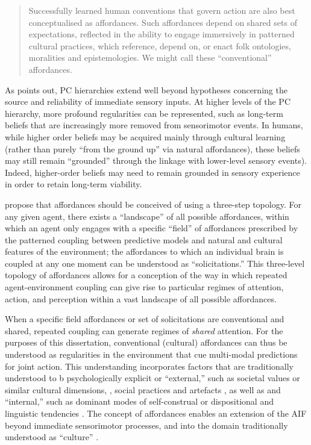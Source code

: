 \begin{CJK}{UTF8}{gbsn}
\begin{quote}
  Successfully learned human conventions that govern action are also best conceptualised as affordances. Such affordances depend on shared sets of expectations, reflected in the ability to engage immersively in patterned cultural practices, which reference, depend on, or enact folk ontologies, moralities and epistemologies. We might call these ``conventional'' affordances.
\end{quote}

As \textcite[906]{Pezzulo2014} points out, PC hierarchies extend well beyond hypotheses concerning the source and reliability of immediate sensory inputs. At higher levels of the PC hierarchy, more profound regularities can be represented, such as long-term beliefs that are increasingly more removed from sensorimotor events. In humans, while higher order beliefs may be acquired mainly through cultural learning (rather than purely ``from the ground up'' via natural affordances),  these beliefs may still remain ``grounded'' through the linkage with lower-level sensory events).  Indeed, higher-order beliefs may need to remain grounded in sensory experience in order to retain long-term viability.

\textcite{Bruineberg2014} propose that affordances should be conceived of using a three-step topology. For any given agent, there exists a ``landscape'' of all possible affordances, within which an agent only engages with a specific ``field'' of affordances prescribed by the patterned coupling between predictive models and natural and cultural features of the environment; the affordances to which an individual brain is coupled at any one moment can be understood as ``solicitations.''  This three-level topology of affordances allows for a conception of the way in which repeated agent-environment coupling can give rise to particular regimes of attention, action, and perception within a vast landscape of all possible affordances.

When a specific field affordances or set of solicitations are conventional and shared, repeated coupling can generate regimes of \textit{shared} attention. For the purposes of this dissertation, conventional (cultural) affordances can thus be understood as regularities in the environment that cue multi-modal predictions for joint action.  This understanding incorporates factors that are traditionally understood to b psychologically explicit or ``external,'' such as societal values or similar cultural dimensions, \citep{Hofstede1991,Schwartz1992}, social practices and artefacts  \citep{Nisbett2003a}, as well as and ``internal,'' such as dominant modes of self-construal or dispositional and linguistic tendencies \citep{Markus1991}.  The concept of affordances enables an extension of the AIF beyond immediate sensorimotor processes, and into the domain traditionally understood as ``culture'' \citep{Roepstorff2010}.


\end{CJK}
